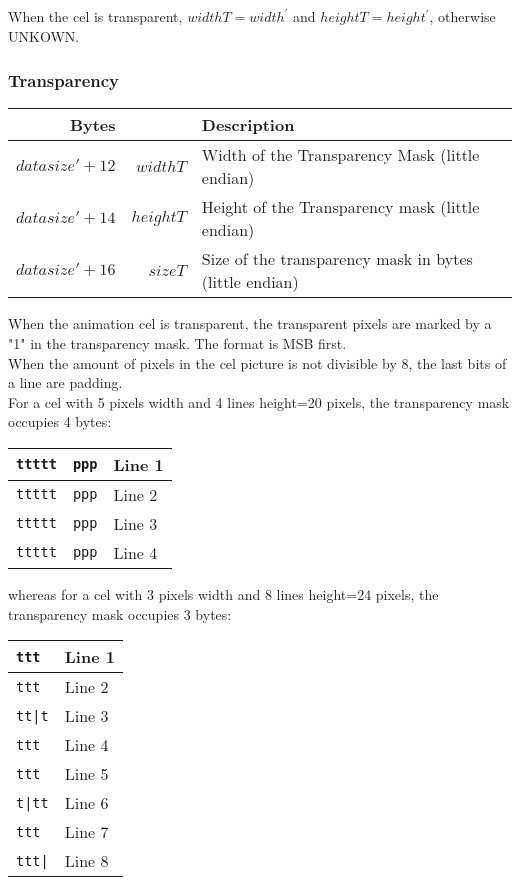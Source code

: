 \documentclass[11pt,twoside,openright]{report}
\begin{document}
When the cel is transparent, $widthT=width^\prime$ and $heightT=height^\prime$, otherwise UNKOWN.

\subsubsection{Transparency}
\begin{tabular}{r|rl}
Bytes&&Description\\\hline
$datasize\prime+12$&$widthT$&Width of the Transparency Mask (little endian)\\
$datasize\prime+14$&$heightT$&Height of the Transparency mask (little endian)\\
$datasize\prime+16$&$sizeT$&Size of the transparency mask in bytes (little endian)\\
\end{tabular}

When the animation cel is transparent, the transparent pixels are marked by a "1" in the transparency mask. The format is MSB first.\\

When the amount of pixels in the cel picture is not divisible by 8, the last bits of a line are padding.\\

For a cel with 5 pixels width and 4 lines height=20 pixels, the transparency mask occupies 4 bytes:\\
\begin{tabular}{l|ll}
{\tt ttttt}&{\tt ppp}&Line 1\\\hline
{\tt ttttt}&{\tt ppp}&Line 2\\\hline
{\tt ttttt}&{\tt ppp}&Line 3\\\hline
{\tt ttttt}&{\tt ppp}&Line 4\\
\end{tabular}

whereas for a cel with 3 pixels width and 8 lines height=24 pixels, the transparency mask occupies 3 bytes:\\
\begin{tabular}{ll}
{\tt ttt}&Line 1\\\hline
{\tt ttt}&Line 2\\\hline
{\tt tt|t}&Line 3\\\hline
{\tt ttt}&Line 4\\\hline
{\tt ttt}&Line 5\\\hline
{\tt t|tt}&Line 6\\\hline
{\tt ttt}&Line 7\\\hline
{\tt ttt|}&Line 8\\\hline
\end{tabular}
\end{document}
